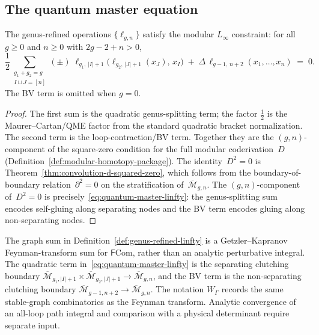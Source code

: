 \subsection{The quantum master equation}

\begin{theorem}
\label{thm:quantum-linfty-master}
The genus-refined operations $\{\ell_{g,n}\}$ satisfy the modular
$L_\infty$ constraint: for all $g \ge 0$ and $n \ge 0$ with
$2g - 2 + n > 0$,
\begin{equation}\label{eq:quantum-master-linfty}
 \frac{1}{2}
 \sum_{\substack{g_1 + g_2 = g \\ I \sqcup J = [n]}}
 (\pm)\; \ell_{g_1,\,|I|+1}\bigl(
 \ell_{g_2,\,|J|+1}(x_J),\, x_I\bigr)
 \;+\;
 \Delta\, \ell_{g-1,\,n+2}(x_1, \dotsc, x_n)
 \;=\; 0.
\end{equation}
The BV term is omitted when $g=0$.
\end{theorem}

\begin{proof}
The first sum is the quadratic genus-splitting term; the factor
$\tfrac{1}{2}$ is the Maurer--Cartan/QME factor from
the standard quadratic bracket normalization.  The second term is the
loop-contraction/BV term.  Together they are the
$(g,n)$-component of the square-zero condition for the full modular
coderivation~$D$
(Definition~\ref{def:modular-homotopy-package}).
The identity~$D^2 = 0$ is
Theorem~\ref{thm:convolution-d-squared-zero}, which
follows from the boundary-of-boundary relation~$\partial^2 = 0$
on the stratification of~$\overline{\mathcal{M}}_{g,n}$.
The $(g,n)$-component of~$D^2 = 0$ is
precisely~\eqref{eq:quantum-master-linfty}: the
genus-splitting sum encodes self-gluing along separating
nodes and the BV term encodes gluing along non-separating
nodes.
\end{proof}

\begin{remark}
\label{rem:qc-feynman-bv-comparison}
The graph sum in Definition~\ref{def:genus-refined-linfty} is a
Getzler--Kapranov Feynman-transform sum for
$\mathsf F\mathrm{Com}$, rather than an analytic perturbative
integral.
The quadratic term in~\eqref{eq:quantum-master-linfty} is the
separating clutching boundary
$\overline{\mathcal M}_{g_1,|I|+1}\times
\overline{\mathcal M}_{g_2,|J|+1}\to
\overline{\mathcal M}_{g,n}$, and the BV term is the
non-separating clutching boundary
$\overline{\mathcal M}_{g-1,n+2}\to\overline{\mathcal M}_{g,n}$.
The notation $W_\Gamma$ records the same stable-graph combinatorics as
the Feynman transform.  Analytic convergence of an all-loop path
integral and comparison with a physical determinant require separate
input.
\end{remark}

